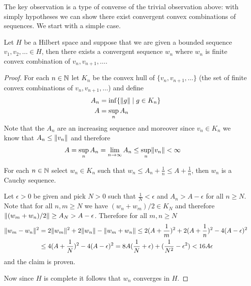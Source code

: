 The key observation is a type of converse of the trivial observation above: with simply hypotheses we can show there exist convergent convex combinations of sequences.  We start with a simple case.
\begin{lem}\label{KomlosHilbertSpace}Let $H$ be a Hilbert space and suppose that we are given a bounded sequence $v_1, v_2, \dotsc \in H$, then there exists a convergent sequence $w_n$ where $w_n$ is finite convex combination of $v_n, v_{n+1}, \dotsc$.  
\end{lem}
\begin{proof}
For each $n \in \mathbb{N}$ let $K_n$ be the convex hull of $\lbrace v_n, v_{n+1}, \dotsc \rbrace$ (the set of finite convex combinations of $v_n, v_{n+1}, \dotsc$) and define
\begin{align*}
A_n &= \inf \lbrace \lVert g \rVert \mid g \in K_n \rbrace \\
A &= \sup_{n} A_n
\end{align*}
Note that the $A_n$ are an increasing sequence and moreover since $v_n \in K_n$ we know that $A_n \leq \lVert v_n \rVert$ and therefore 
\begin{align*}
A &= \sup_n A_n = \lim_{n \to \infty} A_n \leq \sup_{n} \lVert v_n \rVert < \infty
\end{align*}

\begin{clm}For each $n \in \mathbb{N}$ select $w_n \in K_n$ such that $w_n \leq A_n + \frac{1}{n} \leq A + \frac{1}{n}$, then $w_n$ is a Cauchy sequence.
\end{clm}
Let $\epsilon > 0$ be given and pick $N > 0$ such that $\frac{1}{N} < \epsilon$ and $A_n > A - \epsilon$ for all $n \geq N$.  Note that for all $n,m \geq N$ we have $(w_n + w_m)/2 \in K_{N}$ and therefore
$\lVert (w_m+w_n)/2 \rVert \geq A_N > A - \epsilon$.  Therefore for all $m,n \geq N$
\begin{align*}
\lVert w_m - w_n \rVert^2 &= 2\lVert w_m \rVert^2 + 2 \lVert w_n \rVert - \lVert w_m + w_n \rVert \leq 2(A + \frac{1}{m})^2 + 2(A + \frac{1}{n})^2 - 4 (A - \epsilon)^2 \\
&\leq 4(A + \frac{1}{N})^2 - 4(A - \epsilon)^2 = 8 A (\frac{1}{N} + \epsilon) + (\frac{1}{N^2} - \epsilon^2) < 16 A \epsilon
\end{align*}
and the claim is proven.

Now since $H$ is complete it follows that $w_n$ converges in $H$.
\end{proof}

